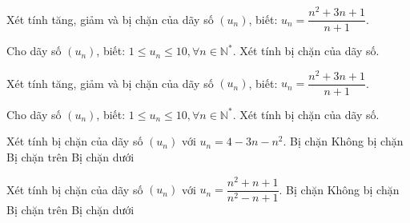 \begin{bt}%
	Xét tính tăng, giảm và bị chặn của dãy số $(u_n)$, biết: $u_n=\dfrac{n^2+3n+1}{n+1}$. 
\end{bt}

\begin{ex}%
	Cho dãy số $(u_n)$, biết: $1 \le u_n\le 10, \forall n\in \mathbb{N}^*$. Xét tính bị chặn của dãy số. 
\end{ex}

\begin{ex}%
	Xét tính  tăng, giảm và bị chặn của dãy số $(u_n)$, biết: $u_n=\dfrac{n^2+3n+1}{n+1}$.
\end{ex}

\begin{bt}%
	Cho dãy số  $(u_n)$, biết: $1 \le u_n\le 10, \forall n\in \mathbb{N}^*$. Xét tính bị chặn của dãy số.
\end{bt}

\begin{ex}%
	Xét  tính bị chặn của dãy số $(u_n)$ với $u_n=4-3n-n^2$.
	 \choice
		 {Bị chặn}
		 {Không bị chặn}
		{\True Bị chặn trên} 
		{Bị chặn  dưới}
\end{ex}

\begin{ex}%
	Xét tính bị  chặn của dãy số $(u_n)$ với $u_n=\dfrac{n^2+n+1}{n^2-n+1}$.
	 \choice
		 {\True Bị chặn}
		{Không  bị chặn}
		 {Bị chặn trên}
		{Bị chặn dưới} 
\end{ex}


